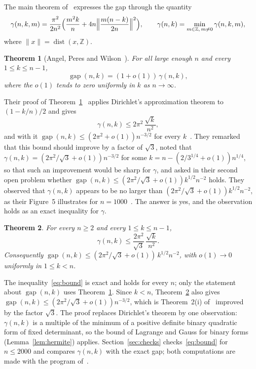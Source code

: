\documentclass[11pt]{amsart}
\newtheorem{theorem}{Theorem}[section]
\theoremstyle{remark}
\newcommand{\gap}{\operatorname{gap}}
\begin{document}
The main theorem of~\cite{APW08} expresses the gap through the quantity
\begin{equation}\label{eq:gamma}
\gamma(n,k,m)=\frac{\pi^2}{2n^2}\Bigl(\frac{m^2k}{n}+4n\Bigl\|\frac{m(n-k)}{2n}\Bigr\|^2\Bigr),\qquad
\gamma(n,k)=\min_{m\in\mathbb Z,\,m\ne0}\gamma(n,k,m),
\end{equation}
where $\|x\|=\operatorname{dist}(x,\mathbb Z)$.

\begin{theorem}[Angel, Peres and Wilson~{\cite[Theorem~4]{APW08}}]\label{thm:apw}
For all large enough $n$ and every $1\le k\le n-1$,
\[
\gap(n,k)=(1+o(1))\,\gamma(n,k),
\]
where the $o(1)$ tends to zero uniformly in $k$ as $n\to\infty$.
\end{theorem}

Their proof of Theorem~\ref{thm:apw}~\cite[p.~13]{APW08} applies Dirichlet's approximation theorem to
$(1-k/n)/2$ and gives
\[
\gamma(n,k)\le 2\pi^2\,\frac{\sqrt k}{n^2},
\]
and with it $\gap(n,k)\le(2\pi^2+o(1))n^{-3/2}$ for every $k$~\cite[Theorem~2(i)]{APW08}. They
remarked that this bound should improve by a factor of $\sqrt3$, noted that $\gamma(n,k)=(2\pi^2/\sqrt3+o(1))n^{-3/2}$
for some $k=n-(2/3^{1/4}+o(1))n^{1/4}$, so that such an improvement would be sharp for $\gamma$, and asked in their second open problem whether
$\gap(n,k)\le(2\pi^2/\sqrt3+o(1))k^{1/2}n^{-2}$ holds. They observed that $\gamma(n,k)$ appears to be no larger than
$(2\pi^2/\sqrt3+o(1))k^{1/2}n^{-2}$, as their Figure~5 illustrates for $n=1000$~\cite[Section~6]{APW08}. The answer
is yes, and the observation holds as an exact inequality for $\gamma$.

\begin{theorem}\label{thm:main}
For every $n\ge2$ and every $1\le k\le n-1$,
\begin{equation}\label{eq:bound}
\gamma(n,k)\le\frac{2\pi^2}{\sqrt3}\,\frac{\sqrt k}{n^2}.
\end{equation}
Consequently $\gap(n,k)\le(2\pi^2/\sqrt3+o(1))\,k^{1/2}n^{-2}$, with $o(1)\to0$ uniformly in $1\le k<n$.
\end{theorem}

The inequality~\eqref{eq:bound} is exact and holds for every $n$; only the statement about $\gap(n,k)$ uses
Theorem~\ref{thm:apw}. Since $k<n$, Theorem~\ref{thm:main} also gives $\gap(n,k)\le(2\pi^2/\sqrt3+o(1))n^{-3/2}$, which is Theorem~2(i)
of~\cite{APW08} improved by the factor $\sqrt3$. The proof replaces Dirichlet's theorem by one observation: $\gamma(n,k)$ is a
multiple of the minimum of a positive definite binary quadratic form of fixed determinant, so the bound of Lagrange
and Gauss for binary forms (Lemma~\ref{lem:hermite}) applies. Section~\ref{sec:checks} checks~\eqref{eq:bound} for $n\le2000$ and compares
$\gamma(n,k)$ with the exact gap; both computations are made with the program of~\cite{Repo}.
\end{document}
